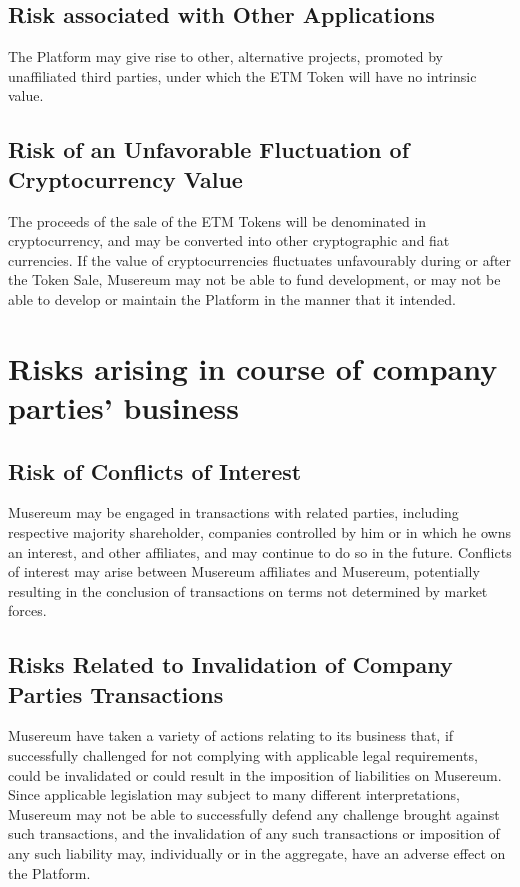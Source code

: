 \documentclass[12pt]{report}
\begin{document}
\subsection*{Risk associated with Other Applications}
The Platform may give rise to other, alternative projects, promoted by unaffiliated third parties, under which the ETM Token will have no intrinsic value.

\subsection*{Risk of an Unfavorable Fluctuation of Cryptocurrency Value}
The proceeds of the sale of the ETM Tokens will be denominated in cryptocurrency, and may be converted into other cryptographic and fiat currencies. If the value of cryptocurrencies fluctuates unfavourably during or after the Token Sale, Musereum may not be able to fund development, or may not be able to develop or maintain the Platform in the manner that it intended.

\section{Risks arising in course of company parties' business}
\subsection*{Risk of Conflicts of Interest}
Musereum may be engaged in transactions with related parties, including respective majority shareholder, companies controlled by him or in which he owns an interest, and other affiliates, and may continue to do so in the future. Conflicts of interest may arise between Musereum affiliates and Musereum, potentially resulting in the conclusion of transactions on terms not determined by market forces.

\subsection*{Risks Related to Invalidation of Company Parties Transactions}
Musereum have taken a variety of actions relating to its business that, if successfully challenged for not complying with applicable legal requirements, could be invalidated or could result in the imposition of liabilities on Musereum. Since applicable legislation may subject to many different interpretations, Musereum may not be able to successfully defend any challenge brought against such transactions, and the invalidation of any such transactions or imposition of any such liability may, individually or in the aggregate, have an adverse effect on the Platform.
\end{document}
